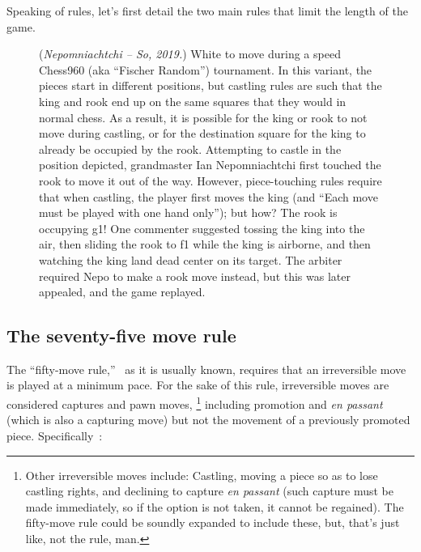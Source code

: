 \documentclass[twocolumn]{article}
\begin{document}
Speaking of rules, let's first detail the two main rules that limit the
length of the game.

\begin{figure}
  \begin{center}
    \chessboard[
      setfen=2nr1r1k/pb1n1pqp/1p2p1p1/1N1pN3/5P2/1P4P1/P2PPQ1P/2R1K1RB,
      pgfstyle=curvemove,markmoves={e1-g1},
      pgfstyle=straightmove,markmoves={g1-f1},
      showmover=false]
  \end{center}
  \caption{ ({\it Nepomniachtchi -- So, 2019.}) White to move during a
    speed Chess960 (aka ``Fischer Random'') tournament. In this
    variant, the pieces start in different positions, but castling
    rules are such that the king and rook end up on the same squares
    that they would in normal chess. As a result, it is possible for
    the king or rook to not move during castling, or for the
    destination square for the king to already be occupied by the
    rook. Attempting to castle in the position depicted, grandmaster
    Ian Nepomniachtchi first touched the rook to move it out of the
    way. However, piece-touching rules require that when castling, the
    player first moves the king (and ``Each move must be played with
    one hand only''); but how? The rook is occupying g1! One commenter
    suggested tossing the king into the air, then sliding the rook to
    f1 while the king is airborne, and then watching the king land
    dead center on its target. The arbiter required Nepo to make a
    rook move instead, but this was later appealed, and the game
    replayed. } \label{fig:castle960}
\end{figure}


\subsection{The seventy-five move rule} \label{sec:75}

The ``fifty-move rule,''~\cite{wikipedia50move} as it is usually
known, requires that an irreversible move is played at a minimum pace.
For the sake of this rule, irreversible moves are considered captures
and pawn moves,%
\footnote{ Other irreversible moves include: Castling, moving a piece
  so as to lose castling rights, and declining to capture {\it en
    passant} (such capture must be made immediately, so if the option
  is not taken, it cannot be regained). The fifty-move rule could be
  soundly expanded to include these, but, that's just like, not the
  rule, man.}
%
including promotion and {\it en passant} (which is also a capturing
move) but not the movement of a previously promoted piece.
Specifically~\cite{fiderules}:
\end{document}
